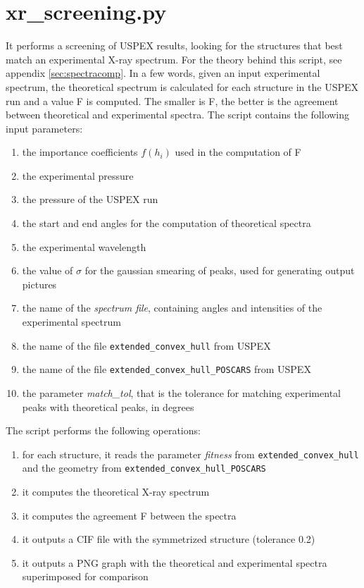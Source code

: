 \documentclass{article}
\begin{document}
\section{xr\_screening.py}
It performs a screening of USPEX results, looking for the structures that best match an experimental X-ray spectrum. For the theory behind this script, see appendix \ref{sec:spectracomp}. In a few words, given an input experimental spectrum, the theoretical spectrum is calculated for each structure in the USPEX run and a value F is computed. The smaller is F, the better is the agreement between theoretical and experimental spectra. The script contains the following input parameters:
\begin{enumerate}
	\item the importance coefficients $f(h_i)$ used in the computation of F
	\item the experimental pressure
	\item the pressure of the USPEX run
	\item the start and end angles for the computation of theoretical spectra
	\item the experimental wavelength
	\item the value of $\sigma$ for the gaussian smearing of peaks, used for generating output pictures
	\item the name of the \emph{spectrum file}, containing angles and intensities of the experimental spectrum
	\item the name of the file \texttt{extended\_convex\_hull} from USPEX
	\item the name of the file \texttt{extended\_convex\_hull\_POSCARS} from USPEX
	\item the parameter \emph{match\_tol}, that is the tolerance for matching experimental peaks with theoretical peaks, in degrees
\end{enumerate}
The script performs the following operations:
\begin{enumerate}
	\item for each structure, it reads the parameter \emph{fitness} from \texttt{extended\_convex\_hull} and the geometry from \texttt{extended\_convex\_hull\_POSCARS}
	\item it computes the theoretical X-ray spectrum
	\item it computes the agreement F between the spectra
	\item it outputs a CIF file with the symmetrized structure (tolerance 0.2)
	\item it outputs a PNG graph with the theoretical and experimental spectra superimposed for comparison
\end{enumerate}
\end{document}
